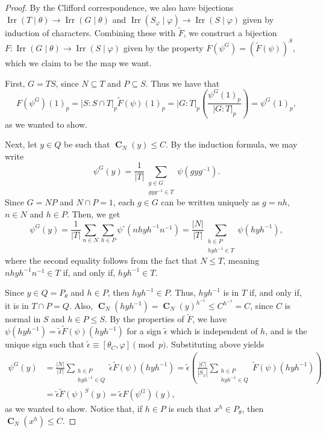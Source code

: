 \documentclass[12pt]{amsart}
\DeclareMathOperator{\CB}{\mathbf{C}}
\DeclareMathOperator{\Irr}{Irr}
\theoremstyle{remark}
\theoremstyle{definition}
\theoremstyle{plain}
\theoremstyle{definition}
\numberwithin{equation}{section}
\begin{document}
\begin{proof}
	By the Clifford correspondence, we also have bijections $\Irr(T\mid\theta) \to \Irr(G\mid\theta)$ and $\Irr(S_\varphi \mid \varphi) \to \Irr(S\mid \varphi)$ given by induction of characters. Combining these with $\tilde{F}$, we construct a bijection $F: \Irr(G \mid \theta) \to \Irr(S\mid \varphi)$ given by the property $F(\psi^G) = (\tilde{F}(\psi))^S$, which we claim to be the map we want.
	
	First, $G = TS$, since $N \subseteq T$ and $P \subseteq S$. Thus we have that
	\begin{equation*}
		F(\psi^G)(1)_p = |S:S\cap T|_p \tilde{F}(\psi)(1)_p = |G:T|_p \left(\frac{\psi^G(1)_p}{|G:T|_p}\right) = \psi^G(1)_p,
	\end{equation*}
	as we wanted to show.
	
	Next, let $y \in Q$ be such that $\CB_N(y) \leq C$. By the induction formula, we may write
	\begin{equation*}
		\psi^G(y) = \frac{1}{|T|} \sum_{\substack {g \in G \\ gyg^{-1} \in T}} \psi(gyg^{-1}).
	\end{equation*}
	Since $G = NP$ and $N \cap P = 1$, each $g \in G$ can be written uniquely as $g = nh$, $n \in N$ and $h \in P$. Then, we get
	\begin{equation*}
		\psi^G(y) = \frac{1}{|T|} \sum_{n \in N} \sum_{h \in P} \psi^\circ(nhyh^{-1}n^{-1}) = \frac{|N|}{|T|} \sum_{\substack{h \in P \\ hyh^{-1} \in T}} \psi(hyh^{-1}),
	\end{equation*}
	where the second equality follows from the fact that $N \leq T$, meaning $nhyh^{-1}n^{-1} \in T$ if, and only if, $hyh^{-1} \in T$.
	
	Since $y \in Q = P_\theta$ and $h \in P$, then $hyh^{-1} \in P$. Thus, $hyh^{-1}$ is in $T$ if, and only if, it is in $T \cap P = Q$. Also, $\CB_N(hyh^{-1}) = \CB_N(y)^{h^{-1}} \leq C^{h^{-1}} = C$, since $C$ is normal in $S$ and $h \in P \leq S$. By the properties of $\tilde{F}$, we have $\psi(hyh^{-1}) = \tilde{\epsilon} \tilde{F}(\psi)(hyh^{-1})$ for a sign $\tilde{\epsilon}$ which is independent of $h$, and is the unique sign such that $\tilde{\epsilon} \equiv [\theta_C, \varphi] \pmod{p}$. Substituting above yields
	\begin{align*}
		\psi^G(y) &= \frac{|N|}{|T|} \sum_{\substack{h \in P \\ hyh^{-1} \in Q}} \tilde{\epsilon}\tilde{F}(\psi)(hyh^{-1}) = \tilde{\epsilon} \left(\frac{|C|}{|S_\varphi|} \sum_{\substack{h \in P \\ hyh^{-1} \in Q}} \tilde{F}(\psi)(hyh^{-1})\right)  \\
		&= \tilde{\epsilon} \tilde{F}(\psi)^{S}(y) = \tilde{\epsilon} F(\psi^G)(y),
	\end{align*}
	as we wanted to show. Notice that, if $h \in P$ is such that $x^h \in P_\theta$, then $\CB_N(x^h) \leq C$.
\end{proof}
\end{document}
